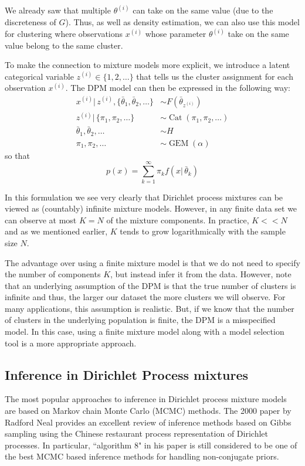 \documentclass[final,3p,times,twocolumn]{elsarticle}
\DeclareMathOperator*{\Cat}{Cat}
\DeclareMathOperator*{\GEM}{GEM}
\begin{document}
We already saw that multiple $\theta^{(i)}$ can take on the same value (due to the discreteness of $G$).
Thus, as well as density estimation, we can also use this model for clustering where observations $x^{(i)}$ whose parameter $\theta^{(i)}$ take on the same value belong to the same cluster.

To make the connection to mixture models more explicit, we introduce a latent categorical variable $z^{(i)} \in \{1,2,\dots\}$ that tells us the cluster assignment for each observation $x^{(i)}$.
The DPM model can then be expressed in the following way:
\begin{equation*}
\begin{split}
x^{(i)} |\,z^{(i)},\{\bar \theta_1,\bar \theta_2,\dots\} &\sim F(\bar \theta_{z^{(i)}})\\
z^{(i)} |\,\{\pi_1,\pi_2,\dots\} &\sim \Cat(\pi_1,\pi_2,\dots)\\
\bar \theta_1,\bar \theta_2,\dots &\sim H\\
\pi_1,\pi_2,\dots &\sim \GEM(\alpha)
\end{split}
\end{equation*}
so that
\begin{equation}
\label{eqn:dpmmixture}
p(x) = \sum_{k=1}^\infty \pi_k f(x|\,\bar \theta_k)
\end{equation}

In this formulation we see very clearly that Dirichlet process mixtures can be viewed as (countably) infinite mixture models.
However, in any finite data set we can observe at most $K = N$ of the mixture components. In practice, $K<<N$ and as we mentioned earlier, $K$ tends to grow logarithmically with the sample size $N$.

The advantage over using a finite mixture model is that we do not need to specify the number of components $K$, but instead infer it from the data.
However, note that an underlying assumption of the DPM is that the true number of clusters is infinite and thus, the larger our dataset the more clusters we will observe.
For many applications, this assumption is realistic.
But, if we know that the number of clusters in the underlying population is finite, the DPM is a misspecified model. In this case, using a finite mixture model along with a model selection tool is a more appropriate approach.

\subsection{Inference in Dirichlet Process mixtures}
The most popular approaches to inference in Dirichlet process mixture models are based on Markov chain Monte Carlo (MCMC) methods.
The 2000 paper by Radford Neal \cite{neal2000} provides an excellent review of inference methods based on Gibbs sampling using the Chinese restaurant process representation of Dirichlet processes.
In particular, ``algorithm 8" in his paper is still considered to be one of the best MCMC based inference methods for handling non-conjugate priors.
\end{document}
